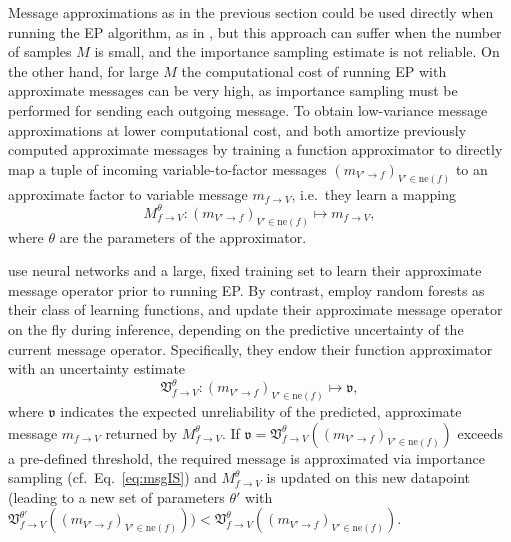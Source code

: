 \documentclass[english]{article}
\theoremstyle{plain}
\theoremstyle{plain}
\newcommand{\factor}{f}				%
\newcommand{\outV}{V}                         %
\newcommand{\fis}[1]{\mathrm{ne}(#1)}   	%
\newcommand{\msg}[2]{m_{#1 \rightarrow #2}}			%
\newcommand{\approxMsg}[3]{M_{#1 \rightarrow #2}^{#3}}			%
\newcommand{\uncert}{{\mathfrak v}}          %
\newcommand{\uncertaintyMsg}[3]{{\mathfrak V}_{#1 \rightarrow #2}^{#3}}			%
\newcommand{\wjnote}[1]{ }
\begin{document}
Message approximations as in the previous section could be 
used directly when running the EP algorithm, as in \cite{Barthelme2011}, 
but this approach can suffer
when the number of samples $M$ is small,
and the  importance sampling estimate is not reliable. 
On the other hand, for large $M$ the computational cost of running EP 
with approximate messages can be very high, 
as importance sampling must be performed for sending each outgoing message.
To obtain low-variance message approximations at lower computational cost, \cite{Heess2013} and \cite{Eslami2014} both amortize previously computed approximate messages by training a function approximator to directly map a tuple of incoming variable-to-factor messages $(\msg{\outV'}{\factor} )_{\outV' \in \fis{\factor}}$ to an approximate factor to variable message $\msg{\factor}{\outV}$, i.e.\, they learn a mapping
\begin{equation}
\approxMsg{\factor}{\outV}{\theta}: (\msg{\outV'}{\factor} )_{\outV' \in \fis{\factor}} \mapsto \msg{\factor}{\outV},
\end{equation}
where $\theta$ are the parameters of the approximator.


\cite{Heess2013} use neural networks and a large, fixed training set to learn their approximate message operator prior to running EP. By contrast, \cite{Eslami2014}
employ random forests as their class of learning functions, and update their approximate message operator on the fly during inference, depending on the predictive uncertainty of the current message operator. Specifically, they endow their function approximator with an uncertainty estimate
\begin{equation}
\uncertaintyMsg{\factor}{\outV}{\theta}: (\msg{\outV'}{\factor} )_{\outV' \in \fis{\factor}} \mapsto \uncert,
\end{equation}
where $\uncert$ indicates the expected unreliability  of the predicted, approximate message $\msg{\factor}{\outV}$ returned by $\approxMsg{\factor}{\outV}{\theta}$. If $\uncert = \uncertaintyMsg{\factor}{\outV}{\theta} \left( (\msg{\outV'}{\factor} )_{\outV' \in \fis{\factor}}\right)$ 
exceeds a pre-defined threshold, the required message is approximated via importance sampling (cf.\ Eq.\ \ref{eq:msgIS}) and $\approxMsg{\factor}{\outV}{\theta}$ is updated
on this new datapoint (leading to a new set of parameters  $\theta'$ with $\uncertaintyMsg{\factor}{\outV}{\theta'} \left( (\msg{\outV'}{\factor} )_{\outV' \in \fis{\factor}}\right)) < \uncertaintyMsg{\factor}{\outV}{\theta} \left( (\msg{\outV'}{\factor} )_{\outV' \in \fis{\factor}}\right)$.
\end{document}
